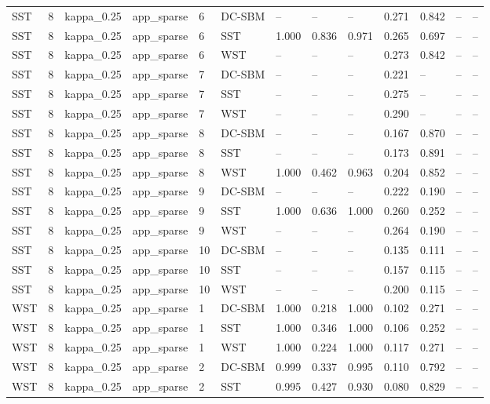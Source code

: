 \begin{table}[!h]
\begin{tabular}[t]{lllllllllllll}
SST & 8 & kappa_0.25 & app_sparse & 6 & DC-SBM & -- & -- & -- & 0.271 & 0.842 & -- & --\\
SST & 8 & kappa_0.25 & app_sparse & 6 & SST & 1.000 & 0.836 & 0.971 & 0.265 & 0.697 & -- & --\\
SST & 8 & kappa_0.25 & app_sparse & 6 & WST & -- & -- & -- & 0.273 & 0.842 & -- & --\\
SST & 8 & kappa_0.25 & app_sparse & 7 & DC-SBM & -- & -- & -- & 0.221 & -- & -- & --\\
SST & 8 & kappa_0.25 & app_sparse & 7 & SST & -- & -- & -- & 0.275 & -- & -- & --\\
SST & 8 & kappa_0.25 & app_sparse & 7 & WST & -- & -- & -- & 0.290 & -- & -- & --\\
SST & 8 & kappa_0.25 & app_sparse & 8 & DC-SBM & -- & -- & -- & 0.167 & 0.870 & -- & --\\
SST & 8 & kappa_0.25 & app_sparse & 8 & SST & -- & -- & -- & 0.173 & 0.891 & -- & --\\
SST & 8 & kappa_0.25 & app_sparse & 8 & WST & 1.000 & 0.462 & 0.963 & 0.204 & 0.852 & -- & --\\
SST & 8 & kappa_0.25 & app_sparse & 9 & DC-SBM & -- & -- & -- & 0.222 & 0.190 & -- & --\\
SST & 8 & kappa_0.25 & app_sparse & 9 & SST & 1.000 & 0.636 & 1.000 & 0.260 & 0.252 & -- & --\\
SST & 8 & kappa_0.25 & app_sparse & 9 & WST & -- & -- & -- & 0.264 & 0.190 & -- & --\\
SST & 8 & kappa_0.25 & app_sparse & 10 & DC-SBM & -- & -- & -- & 0.135 & 0.111 & -- & --\\
SST & 8 & kappa_0.25 & app_sparse & 10 & SST & -- & -- & -- & 0.157 & 0.115 & -- & --\\
SST & 8 & kappa_0.25 & app_sparse & 10 & WST & -- & -- & -- & 0.200 & 0.115 & -- & --\\
WST & 8 & kappa_0.25 & app_sparse & 1 & DC-SBM & 1.000 & 0.218 & 1.000 & 0.102 & 0.271 & -- & --\\
WST & 8 & kappa_0.25 & app_sparse & 1 & SST & 1.000 & 0.346 & 1.000 & 0.106 & 0.252 & -- & --\\
WST & 8 & kappa_0.25 & app_sparse & 1 & WST & 1.000 & 0.224 & 1.000 & 0.117 & 0.271 & -- & --\\
WST & 8 & kappa_0.25 & app_sparse & 2 & DC-SBM & 0.999 & 0.337 & 0.995 & 0.110 & 0.792 & -- & --\\
WST & 8 & kappa_0.25 & app_sparse & 2 & SST & 0.995 & 0.427 & 0.930 & 0.080 & 0.829 & -- & --\\

\end{tabular}
\end{table}
